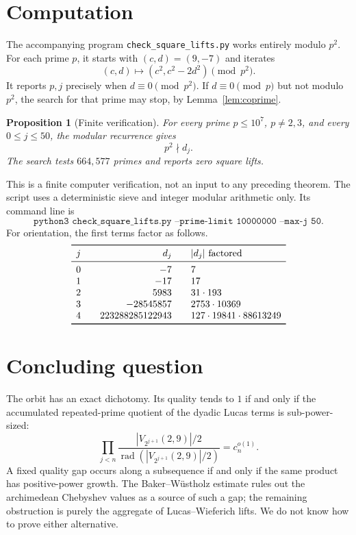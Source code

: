 \documentclass[11pt]{article}
\newtheorem{proposition}[theorem]{Proposition}
\theoremstyle{remark}
\newcommand{\rad}{\operatorname{rad}}
\begin{document}
\section{Computation}

The accompanying program \texttt{check\_square\_lifts.py} works entirely
modulo \(p^2\).  For each prime \(p\), it starts with
\((c,d)=(9,-7)\) and iterates
\[
 (c,d)\longmapsto(c^2,c^2-2d^2)\pmod{p^2}.
\]
It reports \(p,j\) precisely when \(d\equiv0\pmod{p^2}\).  If
\(d\equiv0\pmod p\) but not modulo \(p^2\), the search for that prime may
stop, by Lemma~\ref{lem:coprime}.

\begin{proposition}[Finite verification]\label{prop:computation}
For every prime \(p\leq10^7\), \(p\neq2,3\), and every
\(0\leq j\leq50\), the modular recurrence gives
\[
 p^2\nmid d_j.
\]
The search tests \(664{,}577\) primes and reports zero square lifts.
\end{proposition}

This is a finite computer verification, not an input to any preceding
theorem.  The script uses a deterministic sieve and integer modular
arithmetic only.  Its command line is
\[
\texttt{python3 check\_square\_lifts.py --prime-limit 10000000 --max-j 50}.
\]
For orientation, the first terms factor as follows.
\[
\begin{array}{c@{\qquad}r@{\qquad}l}
\toprule
j&d_j&|d_j|\text{ factored}\\
\midrule
0&-7&7\\
1&-17&17\\
2&5983&31\cdot193\\
3&-28545857&2753\cdot10369\\
4&223288285122943&127\cdot19841\cdot88613249\\
\bottomrule
\end{array}
\]

\section{Concluding question}

The orbit has an exact dichotomy.  Its quality tends to \(1\) if and only
if the accumulated repeated-prime quotient of the dyadic Lucas terms is
sub-power-sized:
\[
 \prod_{j<n}\frac{|V_{2^{j+1}}(2,9)|/2}
                    {\rad(|V_{2^{j+1}}(2,9)|/2)}
   =c_n^{o(1)}.
\]
A fixed quality gap occurs along a subsequence if and only if the same
product has positive-power growth.  The Baker--Wüstholz estimate rules out
the archimedean Chebyshev values as a source of such a gap; the remaining
obstruction is purely the aggregate of Lucas--Wieferich lifts.  We do not
know how to prove either alternative.
\end{document}
